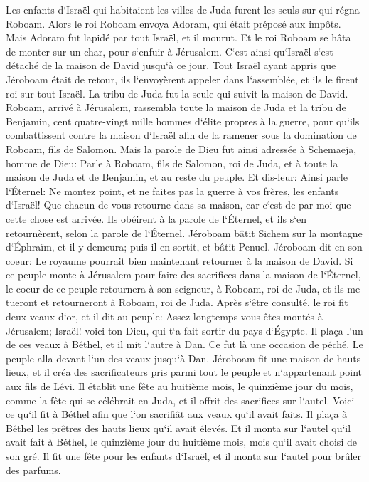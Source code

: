 \verse Les enfants d`Israël qui habitaient les villes de Juda furent les seuls sur qui régna Roboam. 
\verse Alors le roi Roboam envoya Adoram, qui était préposé aux impôts. Mais Adoram fut lapidé par tout Israël, et il mourut. Et le roi Roboam se hâta de monter sur un char, pour s`enfuir à Jérusalem. 
\verse C`est ainsi qu`Israël s`est détaché de la maison de David jusqu`à ce jour. 
\verse Tout Israël ayant appris que Jéroboam était de retour, ils l`envoyèrent appeler dans l`assemblée, et ils le firent roi sur tout Israël. La tribu de Juda fut la seule qui suivit la maison de David. 
\verse Roboam, arrivé à Jérusalem, rassembla toute la maison de Juda et la tribu de Benjamin, cent quatre-vingt mille hommes d`élite propres à la guerre, pour qu`ils combattissent contre la maison d`Israël afin de la ramener sous la domination de Roboam, fils de Salomon. 
\verse Mais la parole de Dieu fut ainsi adressée à Schemaeja, homme de Dieu: 
\verse Parle à Roboam, fils de Salomon, roi de Juda, et à toute la maison de Juda et de Benjamin, et au reste du peuple. 
\verse Et dis-leur: Ainsi parle l`Éternel: Ne montez point, et ne faites pas la guerre à vos frères, les enfants d`Israël! Que chacun de vous retourne dans sa maison, car c`est de par moi que cette chose est arrivée. Ils obéirent à la parole de l`Éternel, et ils s`en retournèrent, selon la parole de l`Éternel. 
\verse Jéroboam bâtit Sichem sur la montagne d`Éphraïm, et il y demeura; puis il en sortit, et bâtit Penuel. 
\verse Jéroboam dit en son coeur: Le royaume pourrait bien maintenant retourner à la maison de David. 
\verse Si ce peuple monte à Jérusalem pour faire des sacrifices dans la maison de l`Éternel, le coeur de ce peuple retournera à son seigneur, à Roboam, roi de Juda, et ils me tueront et retourneront à Roboam, roi de Juda. 
\verse Après s`être consulté, le roi fit deux veaux d`or, et il dit au peuple: Assez longtemps vous êtes montés à Jérusalem; Israël! voici ton Dieu, qui t`a fait sortir du pays d`Égypte. 
\verse Il plaça l`un de ces veaux à Béthel, et il mit l`autre à Dan. 
\verse Ce fut là une occasion de péché. Le peuple alla devant l`un des veaux jusqu`à Dan. 
\verse Jéroboam fit une maison de hauts lieux, et il créa des sacrificateurs pris parmi tout le peuple et n`appartenant point aux fils de Lévi. 
\verse Il établit une fête au huitième mois, le quinzième jour du mois, comme la fête qui se célébrait en Juda, et il offrit des sacrifices sur l`autel. Voici ce qu`il fit à Béthel afin que l`on sacrifiât aux veaux qu`il avait faits. Il plaça à Béthel les prêtres des hauts lieux qu`il avait élevés. 
\verse Et il monta sur l`autel qu`il avait fait à Béthel, le quinzième jour du huitième mois, mois qu`il avait choisi de son gré. Il fit une fête pour les enfants d`Israël, et il monta sur l`autel pour brûler des parfums. 

